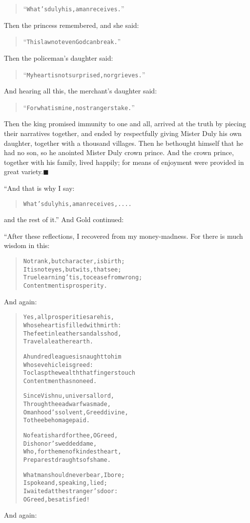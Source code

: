 \documentclass[article, twoside, 14pt]{memoir}
\newcommand{\qed}{\hfill \ensuremath{\blacksquare}}
\renewenvironment{verbatim}{%
\begin{quote}%
\vskip -10pt%
\begin{alltt}\normalfont\large}{\end{alltt}%
\end{quote}%
\vskip -10pt
} %
\begin{document}
\begin{verbatim}
“What's duly his, a man receives.”
\end{verbatim}
Then the princess remembered, and she said:

\begin{verbatim}
“This law not even God can break.”
\end{verbatim}
Then the policeman's daughter said:

\begin{verbatim}
“My heart is not surprised, nor grieves.”
\end{verbatim}
And hearing all this, the merchant's daughter said:

\begin{verbatim}
“For what is mine, no strangers take.”
\end{verbatim}
Then the king promised immunity to one and all, arrived at the
truth by piecing their narratives together, and ended by
respectfully giving Mister Duly his own daughter, together with a
thousand villages. Then he bethought himself that he had no son, so
he anointed Mister Duly crown prince. And the crown prince,
together with his family, lived happily; for means of enjoyment
were provided in great variety.\hyperref[s41]{\qed}

“And that is why I say:

\begin{verbatim}
What's duly his, a man receives, ....
\end{verbatim}
and the rest of it.” And Gold continued:

“After these reflections, I recovered from my money-madness. For
there is much wisdom in this:

\begin{verbatim}
Not rank, but character, is birth;
    It is not eyes, but wits, that see;
True learning 'tis, to cease from wrong;
    Contentment is prosperity.
\end{verbatim}
And again:

\begin{verbatim}
Yes, all prosperities are his,
    Whose heart is filled with mirth:
The feet in leather sandals shod,
    Travel a leather earth.

A hundred leagues is naught to him
    Whose vehicle is greed:
To clasp the wealth that fingers touch
    Contentment has no need.

Since Vishnu, universal lord,
    Through thee a dwarf was made,
O manhood's solvent, Greed divine,
    To thee be homage paid.

No feat is hard for thee, O Greed,
    Dishonor's wedded dame,
Who, for the men of kindest heart,
    Preparest draughts of shame.

What man should never bear, I bore;
    I spoke and, speaking, lied;
I waited at the stranger's door:
    O Greed, be satisfied!
\end{verbatim}
And again:
\end{document}
